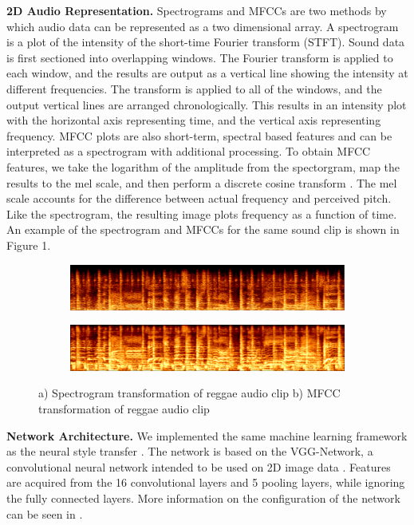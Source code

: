 \documentclass{article}
\begin{document}
\textbf{2D Audio Representation.} \hspace{0.25cm} Spectrograms and MFCCs are two methods by which audio data can be represented as a two dimensional array. A spectrogram is a plot of the intensity of the short-time Fourier transform (STFT). Sound data is first sectioned into overlapping windows. The Fourier transform is applied to each window, and the results are output as a vertical line showing the intensity at different frequencies. The transform is applied to all of the windows, and the output vertical lines are arranged chronologically. This results in an intensity plot with the horizontal axis representing time, and the vertical axis representing frequency. MFCC plots are also short-term, spectral based features and can be interpreted as a spectrogram with additional processing. To obtain MFCC features, we take the logarithm of the amplitude from the spectorgram, map the results to the mel scale, and then perform a discrete cosine transform \citep{Logan2000}. The mel scale accounts for the difference between actual frequency and perceived pitch. Like the spectrogram, the resulting image plots frequency as a function of time. An example of the spectrogram and MFCCs for the same sound clip is shown in Figure 1.

\begin{figure}[h]
\begin{subfigure}{\textwidth}
  \centering
  \includegraphics[width = \textwidth]{spec_example}
  \caption{}
\end{subfigure}
 \begin{subfigure}{\textwidth}
  \centering
  \includegraphics[width = \textwidth]{mel_example}
  \caption{}
\end{subfigure}
\caption{a) Spectrogram transformation of reggae audio clip b) MFCC transformation of reggae audio clip}
\end{figure}

\textbf{Network Architecture.} \hspace{0.25cm} We implemented the same machine learning framework as the neural style transfer \cite{Gatys2015}. The network is based on the VGG-Network, a convolutional neural network intended to be used on 2D image data \citep{Simonyan2014}. Features are acquired from the 16 convolutional layers and 5 pooling layers, while ignoring the fully connected layers. More information on the configuration of the network can be seen in \citep{Gatys2015}.
\end{document}
